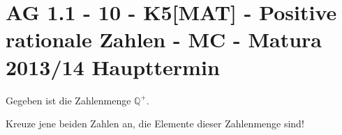 \section{AG 1.1 - 10 - K5[MAT] - Positive rationale Zahlen - MC - Matura 2013/14 Haupttermin}

\begin{beispiel}[AG 1.1]{1} %
				Gegeben ist die Zahlenmenge $\mathbb{Q}^+$.
				
				Kreuze jene beiden Zahlen an, die Elemente dieser Zahlenmenge sind!\leer
				

\end{beispiel}